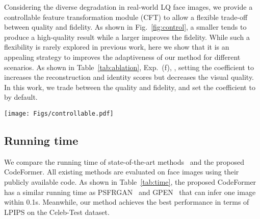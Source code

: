 Considering the diverse degradation in real-world LQ face images, we provide a controllable feature transformation module (CFT) to allow a flexible trade-off between quality and fidelity. As shown in Fig.~\ref{fig:control}, a smaller  tends to produce a high-quality result while a larger  improves the fidelity. 
While such a flexibility is rarely explored in previous work, here we show that it is an appealing strategy to improves the adaptiveness of our method for different scenarios.
As shown in Table~\ref{tab:ablation}, Exp.~(f), \ie, setting the coefficient  to  increases the reconstruction and identity scores but decreases the visual quality. 
In this work, we trade between the quality and fidelity, and set the coefficient  to  by default. 
\begin{figure*}[t]
\centering
	\texttt{[image: Figs/controllable.pdf]}
	\vspace{-4mm}
	\caption{CFT module is capable to generate continuous transitions between image quality and fidelity.}
	\label{fig:control}
	\vspace{-4mm}
\end{figure*}
\subsection{Running time}
We compare the running time of state-of-the-art methods~\cite{menon2020pulse, li2020blind, chen2021progressive, chan2021glean, wang2021towards, yang2021gan} and the proposed CodeFormer.
All existing methods are evaluated on  face images using their publicly available code.
As shown in Table~\ref{tab:time}, the proposed CodeFormer has a similar running time as PSFRGAN~\cite{chen2021progressive} and GPEN~\cite{yang2021gan} that can infer one image within 0.1s. 
Meanwhile, our method achieves the best performance in terms of  LPIPS on the Celeb-Test dataset. 
\begin{table}[ht]
	\vspace{-1mm}
	\footnotesize
	\centering
	\vspace{1mm}
	\smallskip
	\vspace{-1mm}
	\label{tab:time}
\end{table}
